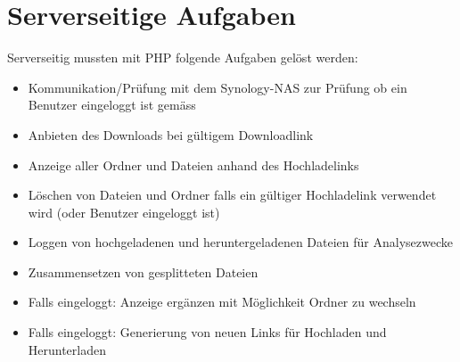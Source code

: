 \section{Serverseitige Aufgaben}
Serverseitig mussten mit PHP folgende Aufgaben gelöst werden:
\begin{itemize}
    \item Kommunikation/Prüfung mit dem Synology-NAS zur Prüfung ob ein Benutzer eingeloggt ist gemäss \cite{Synology}
    \item Anbieten des Downloads bei gültigem Downloadlink
    \item Anzeige aller Ordner und Dateien anhand des Hochladelinks    
    \item Löschen von Dateien und Ordner falls ein gültiger Hochladelink verwendet wird (oder Benutzer eingeloggt ist)
    \item Loggen von hochgeladenen und heruntergeladenen Dateien für Analysezwecke
    \item Zusammensetzen von gesplitteten Dateien
    \item Falls eingeloggt: Anzeige ergänzen mit Möglichkeit Ordner zu wechseln
    \item Falls eingeloggt: Generierung von neuen Links für Hochladen und Herunterladen
\end{itemize}